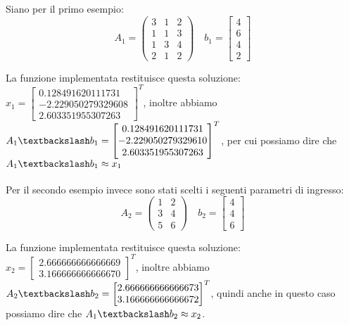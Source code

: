 \begin{center}
\footnotesize\noindent{}\end{center}

\noindent Siano per il primo esempio:
\[
A_1 = \begin{pmatrix} 3 & 1 & 2 \\ 1 & 1& 3 \\ 1 & 3 & 4 \\ 2 & 1 & 2 \end{pmatrix} \quad b_1 = \begin{bmatrix} 4\\6\\4\\2 \end{bmatrix}
\]

\noindent La funzione implementata restituisce questa soluzione: \(x_1 = \begin{bmatrix} 0.128491620111731 \\ -2.229050279329608 \\ 2.603351955307263 \end{bmatrix}^T\), inoltre abbiamo \(A_1 \textbackslash b_1 = \begin{bmatrix} 0.128491620111731 \\ -2.229050279329610 \\ 2.603351955307263 \end{bmatrix}^T\), per cui possiamo dire che \(A_1 \textbackslash b_1 \approx x_1\)
\\
\\

\noindent Per il secondo esempio invece sono stati scelti i seguenti parametri di ingresso:
\[
A_2 = \begin{pmatrix} 1 & 2 \\ 3 & 4 \\ 5 & 6 \end{pmatrix} \quad b_2 = \begin{bmatrix} 4\\4\\6 \end{bmatrix}
\]

\noindent La funzione implementata restituisce questa soluzione: \(x_2=\begin{bmatrix} 2.666666666666669 \\ 3.166666666666670 \end{bmatrix}^T\), inoltre abbiamo \(A_2 \textbackslash b_2 = \begin{bmatrix} 2.666666666666673 \\ 3.166666666666672 \end{bmatrix}^T\), quindi anche in questo caso possiamo dire che \(A_1 \textbackslash b_2 \approx x_2\).
